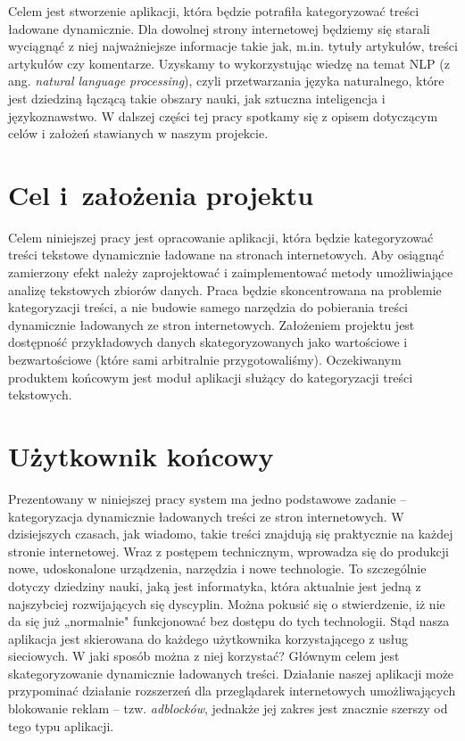     Celem jest stworzenie aplikacji, która będzie potrafiła kategoryzować treści ładowane dynamicznie. Dla dowolnej strony internetowej będziemy się starali wyciągnąć z niej najważniejsze informacje takie jak, m.in.  tytuły artykułów, treści artykułów czy komentarze. Uzyskamy to wykorzystując wiedzę na temat NLP (z ang. \emph{natural language processing}), czyli przetwarzania języka naturalnego, które jest dziedziną łączącą takie obszary nauki, jak sztuczna inteligencja i językoznawstwo. W dalszej części tej pracy spotkamy się z opisem dotyczącym celów i założeń stawianych w naszym projekcie.


\section{Cel i~założenia projektu}
\label{sec:cel}

Celem niniejszej pracy jest opracowanie aplikacji, która będzie kategoryzować treści tekstowe dynamicznie ładowane na stronach internetowych. Aby osiągnąć zamierzony efekt należy zaprojektować i zaimplementować metody umożliwiające analizę tekstowych zbiorów danych. Praca będzie skoncentrowana na problemie kategoryzacji treści, a nie budowie samego narzędzia do pobierania treści dynamicznie ładowanych ze stron internetowych. Założeniem projektu jest dostępność przykładowych danych skategoryzowanych jako wartościowe i bezwartościowe (które sami arbitralnie przygotowaliśmy). Oczekiwanym produktem końcowym jest moduł aplikacji służący do kategoryzacji treści tekstowych.


\section{Użytkownik końcowy}
\label{sec:uzytkownik}

Prezentowany w niniejszej pracy system ma jedno podstawowe zadanie – kategoryzacja dynamicznie ładowanych treści ze stron internetowych. W dzisiejszych czasach, jak wiadomo, takie treści znajdują się praktycznie na każdej stronie internetowej. Wraz z postępem technicznym, wprowadza się do produkcji nowe, udoskonalone urządzenia, narzędzia i nowe technologie. To szczególnie dotyczy dziedziny nauki, jaką jest informatyka, która aktualnie jest jedną z najszybciej rozwijających się dyscyplin. Można pokusić się o stwierdzenie, iż nie da się już „normalnie" funkcjonować bez dostępu do tych technologii. Stąd nasza aplikacja jest skierowana do każdego użytkownika korzystającego z usług sieciowych. W jaki sposób można z niej korzystać? Głównym celem jest skategoryzowanie dynamicznie ładowanych treści. Działanie naszej aplikacji może przypominać działanie rozszerzeń dla przeglądarek internetowych umożliwających blokowanie reklam – tzw. \textit{adblocków}, jednakże jej zakres jest znacznie szerszy od tego typu aplikacji. 

